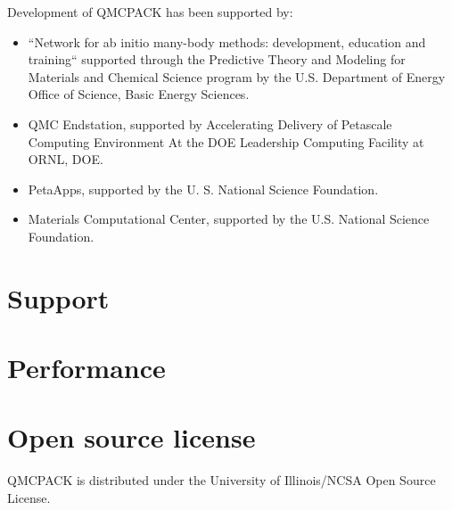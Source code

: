 Development of QMCPACK has been supported by:
\begin{itemize}
\item “Network for ab initio many-body methods: development, education
  and training“ supported through the Predictive
  Theory and Modeling for Materials and Chemical Science program by
  the U.S. Department of Energy Office of Science, Basic Energy
  Sciences.
\item QMC Endstation, supported by Accelerating Delivery of Petascale
  Computing Environment At the DOE Leadership Computing Facility at
  ORNL, DOE. 
\item PetaApps, supported by the U. S. National Science
  Foundation.
\item Materials Computational Center, supported by the
  U.S. National Science Foundation.
\end{itemize}



\section{Support}
\label{sec:support}

\section{Performance}
\label{sec:performance}

\section{Open source license}
\label{sec:license}

QMCPACK is distributed under the University of Illinois/NCSA Open
Source License. 

